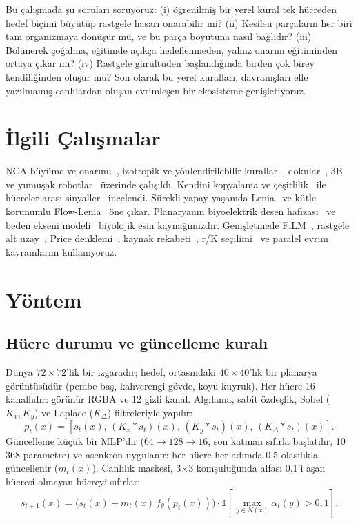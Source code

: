 \documentclass[conference]{IEEEtran}
\begin{document}
Bu çalışmada şu soruları soruyoruz: (i) öğrenilmiş bir yerel kural tek hücreden hedef biçimi büyütüp rastgele hasarı onarabilir mi? (ii) Kesilen parçaların her biri tam organizmaya dönüşür mü, ve bu parça boyutuna nasıl bağlıdır? (iii) Bölünerek çoğalma, eğitimde açıkça hedeflenmeden, yalnız onarım eğitiminden ortaya çıkar mı? (iv) Rastgele gürültüden başlandığında birden çok birey kendiliğinden oluşur mu? Son olarak bu yerel kuralları, davranışları elle yazılmamış canlılardan oluşan evrimleşen bir ekosisteme genişletiyoruz.

\section{İlgili Çalışmalar}
NCA büyüme ve onarımı~\cite{mordvintsev2020growing,nca2026review}, izotropik ve yönlendirilebilir kurallar~\cite{mordvintsev2022isotropic,randazzo2023steerable}, dokular~\cite{niklasson2021textures}, 3B~\cite{sudhakaran2021growing3d} ve yumuşak robotlar~\cite{horibe2021softrobots} üzerinde çalışıldı. Kendini kopyalama ve çeşitlilik~\cite{sinapayen2023selfrep,nca2026selfrepdiversity} ile hücreler arası sinyaller~\cite{stovold2023signals} incelendi. Sürekli yapay yaşamda Lenia~\cite{chan2019lenia} ve kütle korunumlu Flow-Lenia~\cite{plantec2025flowlenia} öne çıkar. Planaryanın biyoelektrik desen hafızası~\cite{durant2017longterm} ve beden ekseni modeli~\cite{pietak2019planaria} biyolojik esin kaynağımızdır. Genişletmede FiLM~\cite{perez2018film}, rastgele alt uzay~\cite{li2018intrinsic}, Price denklemi~\cite{price1970selection}, kaynak rekabeti~\cite{tilman1982resource}, r/K seçilimi~\cite{pianka1970rk} ve paralel evrim~\cite{bolnick2018parallel} kavramlarını kullanıyoruz.

\section{Yöntem}
\subsection{Hücre durumu ve güncelleme kuralı}
Dünya $72\times72$'lik bir ızgaradır; hedef, ortasındaki $40\times40$'lık bir planarya görüntüsüdür (pembe baş, kahverengi gövde, koyu kuyruk). Her hücre 16 kanallıdır: görünür RGBA ve 12 gizli kanal. Algılama, sabit özdeşlik, Sobel ($K_x, K_y$) ve Laplace ($K_\Delta$) filtreleriyle yapılır:
\begin{equation}
p_t(x) = \left[ s_t(x),\, (K_x * s_t)(x),\, (K_y * s_t)(x),\, (K_\Delta * s_t)(x) \right].
\end{equation}
Güncelleme küçük bir MLP'dir ($64\to128\to16$, son katman sıfırla başlatılır, 10\,368 parametre) ve asenkron uygulanır: her hücre her adımda 0,5 olasılıkla güncellenir ($m_t(x)$). Canlılık maskesi, 3$\times$3 komşuluğunda alfası 0,1'i aşan hücresi olmayan hücreyi sıfırlar:
\begin{equation}
s_{t+1}(x) = \big( s_t(x) + m_t(x)\, f_\theta(p_t(x)) \big)\cdot \mathbb{1}\!\left[\max_{y\in N(x)} \alpha_t(y) > 0{,}1\right].
\end{equation}
\end{document}
